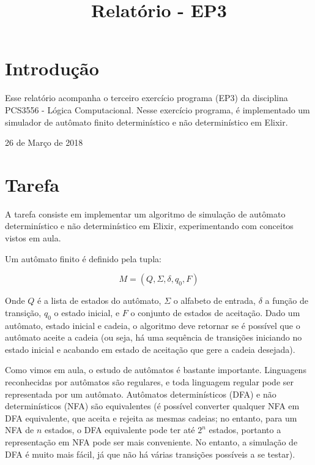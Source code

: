 \documentclass[conference]{IEEEtran}
\begin{document}
\title{Relatório - EP3}

\author{
}

\maketitle

\section{Introdução}
Esse relatório acompanha o terceiro exercício programa (EP3) da disciplina PCS3556 - Lógica Computacional. Nesse exercício programa, é implementado um simulador de autômato finito determinístico e não determinístico em Elixir.

\hfill 26 de Março de 2018

\section{Tarefa}

A tarefa consiste em implementar um algoritmo de simulação de autômato determinístico e não determinístico em Elixir, experimentando com conceitos vistos em aula.

Um autômato finito é definido pela tupla:

\begin{equation}
M = (Q, \Sigma, \delta, q_0, F)
\end{equation}

Onde $Q$ é a lista de estados do autômato, $\Sigma$ o alfabeto de entrada, $\delta$ a função de transição, $q_0$ o estado inicial, e $F$ o conjunto de estados de aceitação. Dado um autômato, estado inicial e cadeia, o algoritmo deve retornar se é possível que o autômato aceite a cadeia (ou seja, há uma sequência de transições iniciando no estado inicial e acabando em estado de aceitação que gere a cadeia desejada).

Como vimos em aula, o estudo de autômatos é bastante importante. Linguagens reconhecidas por autômatos são regulares, e toda linguagem regular pode ser representada por um autômato. Autômatos determinísticos (DFA) e não determinísticos (NFA) são equivalentes (é possível converter qualquer NFA em DFA equivalente, que aceita e rejeita as mesmas cadeias; no entanto, para um NFA de $n$ estados, o DFA equivalente pode ter até $2^n$ estados, portanto a representação em NFA pode ser mais conveniente. No entanto, a simulação de DFA é muito mais fácil, já que não há várias transições possíveis a se testar).
\end{document}
